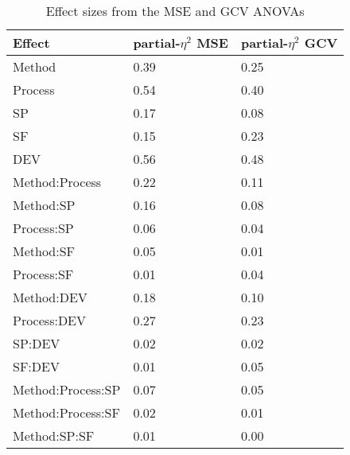 \documentclass[man, floatsintext]{apa7}
\begin{document}
\begin{table}[tbp]
  \begin{center}
    \begin{threeparttable}
      \caption{Effect sizes from the MSE and GCV ANOVAs}
      \label{tab:peta}
      \begin{tabular}{lll}
        \toprule
        Effect                & \multicolumn{1}{c}{partial-$\eta^2$ MSE} &
        \multicolumn{1}{c}{partial-$\eta^2$ GCV}
        \\
        \midrule
        Method                & 0.39                                     & 0.25
        \\
        Process               & 0.54                                     & 0.40
        \\
        SP                    & 0.17                                     & 0.08
        \\
        SF                    & 0.15                                     & 0.23
        \\
        DEV                   & 0.56                                     & 0.48
        \\
        Method:Process        & 0.22                                     & 0.11
        \\
        Method:SP             & 0.16                                     & 0.08
        \\
        Process:SP            & 0.06                                     & 0.04
        \\
        Method:SF             & 0.05                                     & 0.01
        \\
        Process:SF            & 0.01                                     & 0.04
        \\
        Method:DEV            & 0.18                                     & 0.10
        \\
        Process:DEV           & 0.27                                     & 0.23
        \\
        SP:DEV                & 0.02                                     & 0.02
        \\
        SF:DEV                & 0.01                                     & 0.05
        \\
        Method:Process:SP     & 0.07                                     & 0.05
        \\
        Method:Process:SF     & 0.02                                     & 0.01
        \\
        Method:SP:SF          & 0.01                                     & 0.00

\end{tabular}
\end{threeparttable}
\end{center}
\end{table}
\end{document}
